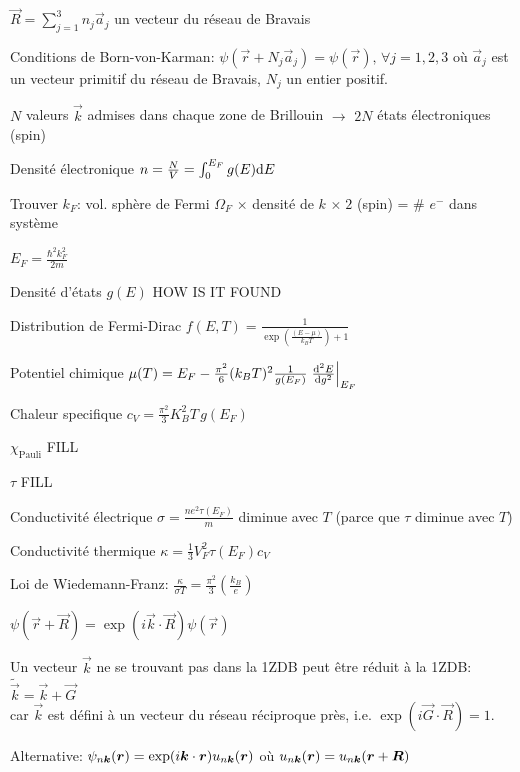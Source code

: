 \begin{squishlist}
    \item $\vec{R} = \sum_{j=1}^{3} n_j \vec{a}_j$ un vecteur du réseau de Bravais
    \item Conditions de Born-von-Karman: $\psi(\vec{r} + N_j \vec{a}_j) = \psi(\vec{r}), \, \forall j=1,2,3$ où $\vec{a}_j$ est un vecteur primitif du réseau de Bravais, $N_j$ un entier positif.
    \item $N$ valeurs $\vec{k}$ admises dans chaque zone de Brillouin $\rightarrow$ $2N$ états électroniques (spin)
    \item Densité électronique $n = \frac{N}{V} = \int_0^{E_F} g(E) \ud E$
\end{squishlist}

\begin{squishlist}
    \item Trouver $k_F$: vol. sphère de Fermi $\Omega_F$ $\times$ densité de $k$ $\times \; 2$ (spin) = \# $e^-$ dans système 
    \item $E_F = \frac{\hbar^2 k_F^2}{2m}$
\end{squishlist}

\begin{squishlist}
    \item Densité d'états $g(E)$ HOW IS IT FOUND
    \item Distribution de Fermi-Dirac $f(E,T) = \frac{1}{\exp\left(\frac{(E- \mu)}{k_B T}\right) + 1}$
    \item Potentiel chimique $\mu(T) = E_F - \frac{\pi^2}{6}(k_B T)^2 \frac{1}{g(E_F)} \left.\dder{g}{E}\right|_{E_F}$
    \item Chaleur specifique $c_V = \frac{\pi^2}{3}K_B^2 T \, g(E_F) $
    \item $\chi_{\text{Pauli}}$ FILL
    \item $\tau$ FILL
    \item Conductivité électrique $\sigma = \frac{n e^2 \tau(E_F)}{m}$ diminue avec $T$ (parce que $\tau$ diminue avec $T$)
    \item Conductivité thermique $\kappa = \frac{1}{3}V_F^2 \tau(E_F) c_V$
    \item Loi de Wiedemann-Franz: $\frac{\kappa}{\sigma T} = \frac{\pi^2}{3}\left(\frac{k_B}{e}\right)$
\end{squishlist}

\begin{squishlist}
    \item $\psi(\vec{r} + \vec{R}) = \exp(i\vec{k} \cdot \vec{R}) \psi(\vec{r})$
    \item Un vecteur $\vec{k}$ ne se trouvant pas dans la 1ZDB peut être réduit à la 1ZDB: $\tilde{\vec{k}} = \vec{k} + \vec{G}$ \\
    car $\vec{k}$ est défini à un vecteur du réseau réciproque près, i.e. $\exp(i \vec{G}\cdot \vec{R}) = 1$.
    \item Alternative: $\psi_{n \vec{k}}(\vr) = \exp(i \vk \cdot \vr ) u_{n \vk}(\vr)$ où $u_{n \vk}(\vr) =  u_{n \vk}(\vr+ \vR)$
\end{squishlist}

